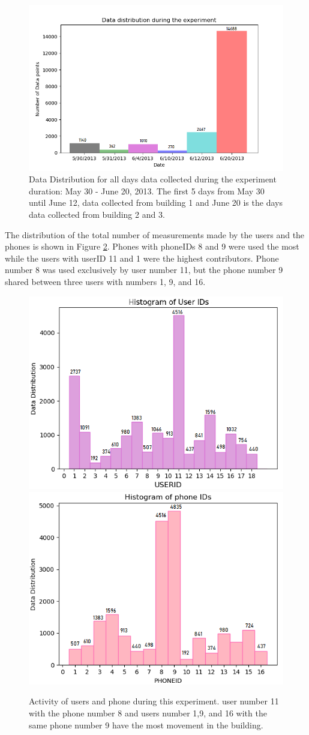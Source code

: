\begin{figure}
    \centering
    \includegraphics[width = 12 cm]{image/Chapters/Chapter6/timedist.png}
    \caption{Data Distribution for all days data collected during the experiment duration: May 30 - June 20, 2013. The first 5  days from May 30 until June 12, data collected from building 1 and June 20 is the days data collected from building 2 and 3.}
    \label{timeline}
\end{figure}


The distribution of the total number of measurements made by the users and the phones is shown in Figure \ref{userphone}. Phones with phoneIDs 8 and 9 were used the most while the users with userID 11 and 1 were the highest contributors. Phone number 8 was used exclusively by user number 11, but the phone number 9 shared between three users with numbers 1, 9, and 16.

\begin{figure}[!h]
    \centering
    \includegraphics[width=.5\textwidth]{image/Chapters/Chapter6/userID_data.png}\hfill
    \includegraphics[width=.5\textwidth]{image/Chapters/Chapter6/phoneID_data.png}
    \\[\smallskipamount]    
    \caption{Activity of users and phone during this experiment. user number 11 with the phone number 8 and users number 1,9, and 16 with the same phone number 9 have the most movement in the building.}
    \label{userphone}
\end{figure}



